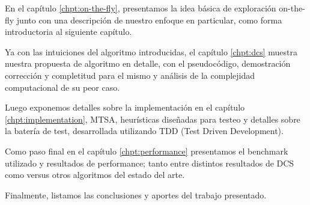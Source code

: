 En el capítulo \ref{chpt:on-the-fly}, presentamos la idea básica de exploración on-the-fly junto con una descripción de nuestro enfoque en particular, como forma introductoria al siguiente capítulo.

Ya con las intuiciones del algoritmo introducidas, el capítulo \ref{chpt:dcs} muestra nuestra propuesta de algoritmo en detalle, con el pseudocódigo, demostración corrección y completitud para el mismo y análisis de la complejidad computacional de su peor caso.

Luego exponemos detalles sobre la implementación en el capítulo \ref{chpt:implementation}, MTSA, heurísticas diseñadas para testeo y detalles sobre la batería de test, desarrollada utilizando TDD (Test Driven Development).

Como paso final en el capítulo \ref{chpt:performance} presentamos el benchmark utilizado y resultados de performance; tanto entre distintos resultados de DCS como versus otros algoritmos del estado del arte.

Finalmente, listamos las conclusiones y aportes del trabajo presentado.









